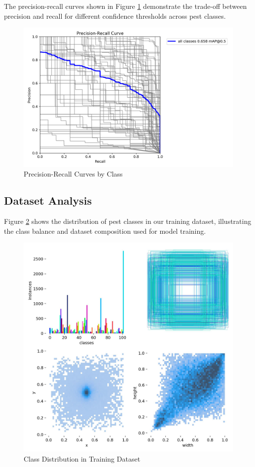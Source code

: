 \documentclass[conference]{IEEEtran}
\begin{document}
The precision-recall curves shown in Figure \ref{fig:pr_curves} demonstrate the trade-off between precision and recall for different confidence thresholds across pest classes.

\begin{figure}[htbp]
\centerline{\includegraphics[width=\columnwidth]{pr_curves.png}}
\caption{Precision-Recall Curves by Class}
\label{fig:pr_curves}
\end{figure}

\subsection{Dataset Analysis}

Figure \ref{fig:labels} shows the distribution of pest classes in our training dataset, illustrating the class balance and dataset composition used for model training.

\begin{figure}[htbp]
\centerline{\includegraphics[width=0.8\columnwidth]{labels.jpg}}
\caption{Class Distribution in Training Dataset}
\label{fig:labels}
\end{figure}
\end{document}
